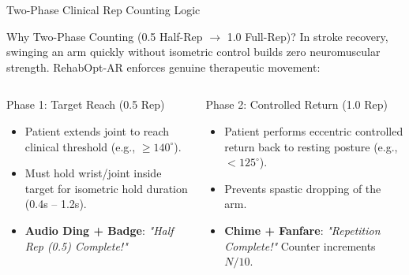 \documentclass{beamer}
\begin{document}
\begin{frame}{Two-Phase Clinical Rep Counting Logic}
\begin{block}{Why Two-Phase Counting (0.5 Half-Rep $\rightarrow$ 1.0 Full-Rep)?}
In stroke recovery, swinging an arm quickly without isometric control builds zero neuromuscular strength. RehabOpt-AR enforces genuine therapeutic movement:
\end{block}

\vspace{3mm}
\begin{columns}
\begin{goodblock}
\begin{block}{Phase 1: Target Reach (0.5 Rep)}
\begin{itemize}
    \item Patient extends joint to reach clinical threshold (e.g., $\ge 140^\circ$).
    \item Must hold wrist/joint inside target for isometric hold duration (0.4s – 1.2s).
    \item \textbf{Audio Ding + Badge}: \textit{"Half Rep (0.5) Complete!"}
\end{itemize}
\end{block}
\end{goodblock}

\begin{block}{Phase 2: Controlled Return (1.0 Rep)}
\begin{itemize}
    \item Patient performs eccentric controlled return back to resting posture (e.g., $< 125^\circ$).
    \item Prevents spastic dropping of the arm.
    \item \textbf{Chime + Fanfare}: \textit{"Repetition Complete!"} Counter increments $N / 10$.
\end{itemize}
\end{block}
\end{columns}
\end{frame}
\end{document}
